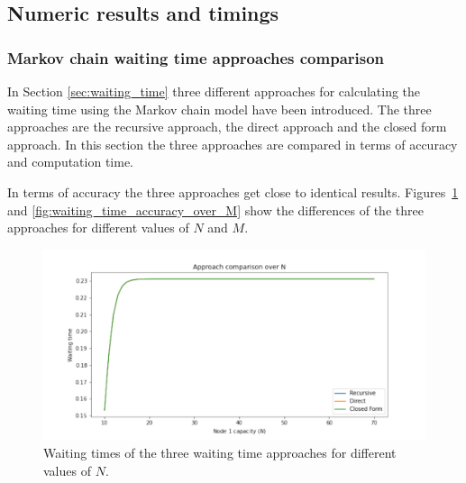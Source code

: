\subsection{Numeric results and timings}\label{sec:truncation_effect}



\subsubsection{Markov chain waiting time approaches comparison}
\label{sec:waiting_time_approach_comparison}

In Section \ref{sec:waiting_time} three different approaches for calculating
the waiting time using the Markov chain model have been introduced.
The three approaches are the recursive approach, the direct approach and
the closed form approach.  %
In this section the three approaches are compared in terms of accuracy and
computation time.

In terms of accuracy the three approaches get close to identical results.
Figures~\ref{fig:waiting_time_accuracy_over_N} and
\ref{fig:waiting_time_accuracy_over_M} show the differences of the three
approaches for different values of \(N\) and \(M\).


\begin{figure}[H]
    \includegraphics[width=\textwidth]{chapters/03_queueing_model/img/numeric_results_and_timings/waiting_time_formulas_comparison/waiting_time_over_N.pdf}
    \caption{
        Waiting times of the three waiting time approaches for different
        values of \(N\).
    }
    \label{fig:waiting_time_accuracy_over_N}
\end{figure}
    

